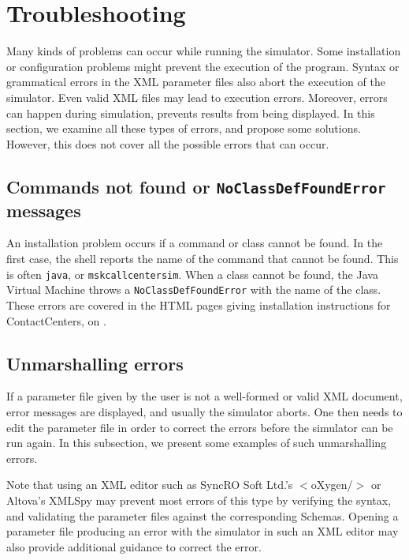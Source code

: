 \section{Troubleshooting}
\label{sec:msktrouble}

Many kinds of problems can occur while running the simulator.
Some installation or configuration problems might prevent the
execution of the program.
Syntax or grammatical errors in the XML parameter files also abort the
execution of the simulator.
Even valid XML files may lead to execution errors.
Moreover, errors can happen during simulation, prevents results from
being displayed.
In this section, we examine all these types of errors, and propose
some solutions.
However, this does not cover all the possible errors that can occur.

\subsection{Commands not found or
  \texttt{No\-Class\-Def\-Found\-Error} messages}

An installation problem occurs if a command or class cannot be found.
In the first case, the shell reports the name of the command that
cannot be found.  This is often \texttt{java}, or
\texttt{mskcallcentersim}.
When a class cannot be found, the Java Virtual Machine throws a
\texttt{No\-Class\-Def\-Found\-Error} with the name of the class.
These errors are covered in the HTML pages giving installation
instructions for ContactCenters, on
\ccurl.

\subsection{Unmarshalling errors}

If a parameter file given by the user is not a well-formed or valid
XML document, error messages are displayed, and usually the simulator
aborts.
One then needs to edit the parameter file in order to correct the
errors before the simulator can be run again.
In this subsection, we present some examples of such unmarshalling
errors.

Note that using an XML editor such as
SyncRO Soft Ltd.'s \mbox{$<$oXygen/$>$} or
Altova's XMLSpy may prevent most errors of this type by
verifying the syntax, and validating the parameter files against the
corresponding Schemas.  Opening a parameter file producing an error
with the simulator in such an XML editor may also provide additional
guidance to correct the error.

